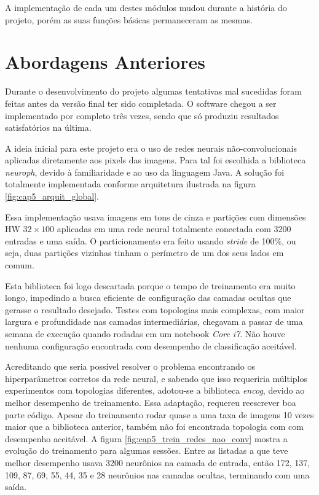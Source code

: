 A implementação de cada um destes módulos mudou durante a história do projeto,
porém as suas funções básicas permaneceram as mesmas.

\section{Abordagens Anteriores}
Durante o desenvolvimento do projeto algumas tentativas mal sucedidas foram
feitas antes da versão final ter sido completada. O software chegou a ser
implementado por completo três vezes, sendo que só produziu resultados
satisfatórios na última.

A ideia inicial para este projeto era o uso de redes neurais não-convolucionais
aplicadas diretamente aos pixels das imagens. Para tal foi escolhida a
biblioteca \emph{neuroph}, devido à familiaridade e ao uso da linguagem Java. A
solução foi totalmente implementada conforme arquitetura ilustrada na figura
\ref{fig:cap5_arquit_global}.

Essa implementação usava imagens em tons de cinza e partições com dimensões HW
$32 \times 100$ aplicadas em uma rede neural totalmente conectada com 3200
entradas e uma saída. O particionamento era feito usando \emph{stride} de
100\%, ou seja, duas partições vizinhas tinham o perímetro de um dos seus
lados em comum.

Esta biblioteca foi logo descartada porque o tempo de treinamento era muito
longo, impedindo a busca eficiente de configuração das camadas ocultas que
gerasse o resultado desejado. Testes com topologias mais complexas, com maior
largura e profundidade nas camadas intermediárias, chegavam a passar de uma
semana de execução quando rodadas em um notebook \emph{Core i7}. Não houve
nenhuma configuração encontrada com desempenho de classificação aceitável.

Acreditando que seria possível resolver o problema encontrando os
hiperparâmetros corretos da rede neural, e sabendo que isso requeriria
múltiplos experimentos com topologias diferentes, adotou-se a biblioteca
\emph{encog},
devido ao melhor desempenho de treinamento. Essa adaptação, requereu reescrever
boa parte código. Apesar do treinamento rodar quase a uma taxa de imagens 10
vezes maior que a biblioteca anterior, também não foi encontrada topologia
com com desempenho aceitável. A figura
\ref{fig:cap5_trein_redes_nao_conv} mostra a
evolução do treinamento para algumas sessões. Entre as listadas a que teve
melhor desempenho usava 3200 neurônios na camada de entrada, então 172, 137,
109, 87, 69, 55, 44, 35 e 28 neurônios nas camadas ocultas, terminando
com uma saída.

